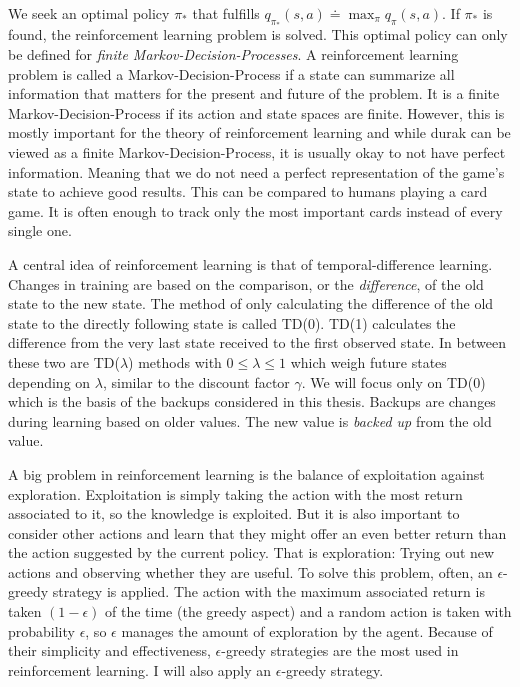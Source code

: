 \documentclass[a4paper,titlepage]{article}
\begin{document}
We seek an optimal policy $\pi_*$ that fulfills $q_{\pi_*}(s, a) \doteq \max_\pi q_\pi(s, a)$. If $\pi_*$ is found, the reinforcement learning problem is solved. This optimal policy can only be defined for \emph{finite Markov-Decision-Processes}. A reinforcement learning problem is called a Markov-Decision-Process if a state can summarize all information that matters for the present and future of the problem. It is a finite Markov-Decision-Process if its action and state spaces are finite. However, this is mostly important for the theory of reinforcement learning and while durak can be viewed as a finite Markov-Decision-Process, it is usually okay to not have perfect information. Meaning that we do not need a perfect representation of the game's state to achieve good results. This can be compared to humans playing a card game. It is often enough to track only the most important cards instead of every single one.

A central idea of reinforcement learning is that of temporal-difference learning. Changes in training are based on the comparison, or the \emph{difference}, of the old state to the new state. The method of only calculating the difference of the old state to the directly following state is called TD(0). TD(1) calculates the difference from the very last state received to the first observed state. In between these two are TD($\lambda$) methods with $0 \leq \lambda \leq 1$ which weigh future states depending on $\lambda$, similar to the discount factor $\gamma$. We will focus only on TD(0) which is the basis of the backups considered in this thesis. Backups are changes during learning based on older values. The new value is \emph{backed up} from the old value.

A big problem in reinforcement learning is the balance of exploitation against exploration. Exploitation is simply taking the action with the most return associated to it, so the knowledge is exploited. But it is also important to consider other actions and learn that they might offer an even better return than the action suggested by the current policy. That is exploration: Trying out new actions and observing whether they are useful. To solve this problem, often, an $\epsilon$-greedy strategy is applied. The action with the maximum associated return is taken $(1 - \epsilon)$ of the time (the greedy aspect) and a random action is taken with probability $\epsilon$, so $\epsilon$ manages the amount of exploration by the agent. Because of their simplicity and effectiveness, $\epsilon$-greedy strategies are the most used in reinforcement learning. I will also apply an $\epsilon$-greedy strategy.
\end{document}
